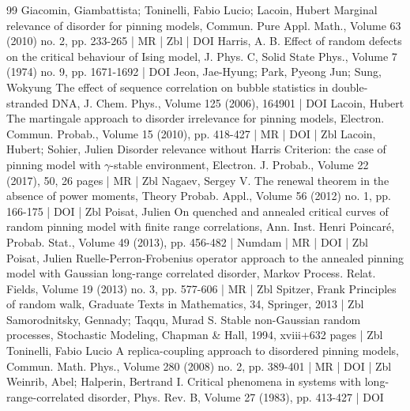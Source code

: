 \documentclass[10pt]{amsart}
\theoremstyle{definition}\newtheorem{defi}[theo]{Definition}\newtheorem{rema}[theo]{Remark}\newtheorem{exam}[theo]{Example}\newtheorem{exem}[theo]{Example}\newtheorem{nota}[theo]{Notation}
\begin{document}
\begin{thebibliography}{99}
Giacomin, Giambattista; Toninelli, Fabio Lucio; Lacoin, Hubert Marginal relevance of disorder for pinning models, Commun. Pure Appl. Math., Volume 63 (2010) no. 2, pp. 233-265 | MR | Zbl | DOI
Harris, A. B. Effect of random defects on the critical behaviour of Ising model, J. Phys. C, Solid State Phys., Volume 7 (1974) no. 9, pp. 1671-1692 | DOI
Jeon, Jae-Hyung; Park, Pyeong Jun; Sung, Wokyung The effect of sequence correlation on bubble statistics in double-stranded DNA, J. Chem. Phys., Volume 125 (2006), 164901 | DOI
Lacoin, Hubert The martingale approach to disorder irrelevance for pinning models, Electron. Commun. Probab., Volume 15 (2010), pp. 418-427 | MR | DOI | Zbl
Lacoin, Hubert; Sohier, Julien Disorder relevance without Harris Criterion: the case of pinning model with \ensuremath{\gamma}-stable environment, Electron. J. Probab., Volume 22 (2017), 50, 26 pages | MR | Zbl
Nagaev, Sergey V. The renewal theorem in the absence of power moments, Theory Probab. Appl., Volume 56 (2012) no. 1, pp. 166-175 | DOI | Zbl
Poisat, Julien On quenched and annealed critical curves of random pinning model with finite range correlations, Ann. Inst. Henri Poincaré, Probab. Stat., Volume 49 (2013), pp. 456-482 | Numdam | MR | DOI | Zbl
Poisat, Julien Ruelle-Perron-Frobenius operator approach to the annealed pinning model with Gaussian long-range correlated disorder, Markov Process. Relat. Fields, Volume 19 (2013) no. 3, pp. 577-606 | MR | Zbl
Spitzer, Frank Principles of random walk, Graduate Texts in Mathematics, 34, Springer, 2013 | Zbl
Samorodnitsky, Gennady; Taqqu, Murad S. Stable non-Gaussian random processes, Stochastic Modeling, Chapman \& Hall, 1994, xviii+632 pages | Zbl
Toninelli, Fabio Lucio A replica-coupling approach to disordered pinning models, Commun. Math. Phys., Volume 280 (2008) no. 2, pp. 389-401 | MR | DOI | Zbl
Weinrib, Abel; Halperin, Bertrand I. Critical phenomena in systems with long-range-correlated disorder, Phys. Rev. B, Volume 27 (1983), pp. 413-427 | DOI
\end{thebibliography}
\end{document}
